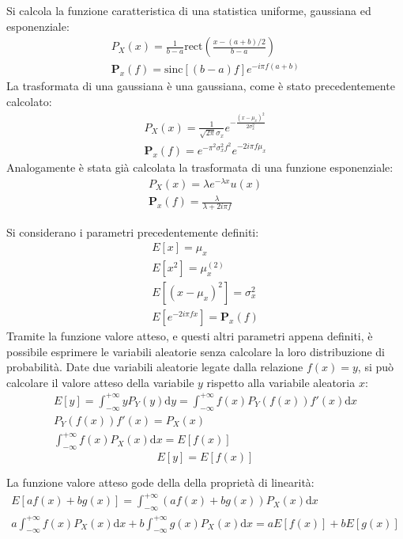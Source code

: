 \documentclass{article}
\newcommand{\rect}{\mathrm{rect}}
\newcommand{\sinc}{\mathrm{sinc}}
\newcommand{\df}{\mathrm{d}}
\numberwithin{equation}{subsection}
\begin{document}
Si calcola la funzione caratteristica di una statistica uniforme, gaussiana ed esponenziale:
\begin{gather*}
    P_X(x)=\displaystyle\frac{1}{b-a}\rect\left(\frac{x-(a+b)/2}{b-a}\right)\\
    \mathbf{P}_x(f)=\displaystyle\sinc\left[(b-a)f\right]e^{-i\pi f(a+b)}
\end{gather*}
La trasformata di una gaussiana è una gaussiana, come è stato precedentemente calcolato: 
\begin{gather*}
    P_X(x)=\frac{1}{\sqrt{2\pi}\sigma_x}e^{-\frac{(x-\mu_x)^2}{2\sigma_x^2}}\\
    \mathbf{P}_x(f)=e^{-\pi^2\sigma_x^2f^2}e^{-2i\pi f\mu_x}
\end{gather*}
Analogamente è stata già calcolata la trasformata di una funzione esponenziale: 
\begin{gather*}
    P_X(x)=\lambda e^{-\lambda x}u(x)\\
    \mathbf{P}_x(f)=\displaystyle\frac{\lambda}{\lambda+2i\pi f}
\end{gather*}


Si considerano i parametri precedentemente definiti:
\begin{gather*}
    E[x]=\mu_x\\
    E[x^2]=\mu_x^{(2)}\\
    E[(x-\mu_x)^2]=\sigma_x^2\\
    E\left[e^{-2i\pi fx}\right]=\mathbf{P}_x(f)
\end{gather*}
Tramite la funzione valore atteso, e questi altri parametri appena definiti, è possibile esprimere le variabili aleatorie senza calcolare la loro distribuzione 
di probabilità. Date due variabili aleatorie legate dalla 
relazione $f(x)=y$, si può calcolare il valore atteso della variabile $y$ rispetto alla variabile aleatoria $x$:
\begin{gather*}
    E[y]=\displaystyle\int_{-\infty}^{+\infty}yP_Y(y)\df y=\int_{-\infty}^{+\infty}f(x)P_Y(f(x))f'(x)\df x\\
    P_Y(f(x))f'(x)=P_X(x)\\
    \int_{-\infty}^{+\infty}f(x)P_X(x)\df x=E[f(x)]
\end{gather*}
\begin{equation}
    E[y]=E[f(x)]
\end{equation}

La funzione valore atteso gode della della proprietà di linearità:
\begin{gather}
    E[af(x)+bg(x)]=\displaystyle\int_{-\infty}^{+\infty}(af(x)+bg(x))P_X(x)\df x\\
    a\int_{-\infty}^{+\infty}f(x)P_X(x)\df x+b\int_{-\infty}^{+\infty}g(x)P_X(x)\df x=aE[f(x)]+bE[g(x)]
\end{gather}
\end{document}
